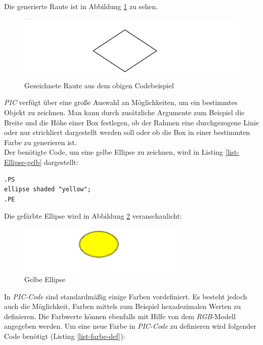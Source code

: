 \noindent
Die generierte Raute ist in Abbildung \ref{Diamant_PIC} zu sehen.
\\
\begin{figure}[H]
	\begin{center}
		\includegraphics[width=13cm]{images/Diamant_Beispiel.png}
		\caption{Gezeichnete Raute aus dem obigen Codebeispiel}
		\label{Diamant_PIC}
	\end{center}
\end{figure}

\noindent
\textit{PIC} verfügt über eine große Auswahl an Möglichkeiten, um ein bestimmtes Objekt zu zeichnen. Man kann durch zusätzliche Argumente zum Beispiel die Breite und die Höhe einer Box festlegen, ob der Rahmen eine durchgezogene Linie oder nur strichliert dargestellt werden soll oder ob die Box in einer bestimmten Farbe zu generieren ist. 
\\
\pra
\noindent
Der benötigte Code, um eine gelbe Ellipse zu zeichnen, wird in Listing \ref{list-Ellipse-gelb} dargestellt: 
\\
\noindent
\lstset{frame=lines}
\lstset{basicstyle=\footnotesize}
\begin{lstlisting}
.PS
ellipse shaded "yellow";
.PE
\end{lstlisting}

\noindent
Die gefärbte Ellipse wird in Abbildung \ref{Ellipse_Gelb} veranschaulicht:
\\
\begin{figure}[H]
	\begin{center}
		\includegraphics[width=8cm]{images/Ellipse_Beispiel.png}
		\caption{Gelbe Ellipse}
		\label{Ellipse_Gelb}
	\end{center}
\end{figure}
\pra
\noindent
In \textit{PIC-Code} sind standardmäßig einige Farben vordefiniert. Es besteht jedoch auch die Möglichkeit, Farben mittels zum Beispiel hexadezimalen Werten zu definieren. Die Farbwerte können ebenfalls mit Hilfe von dem \textit{RGB}-Modell angegeben werden. Um eine neue Farbe in \textit{PIC-Code} zu definieren wird folgender Code benötigt (Listing \ref{list-farbe-def}):
\\


